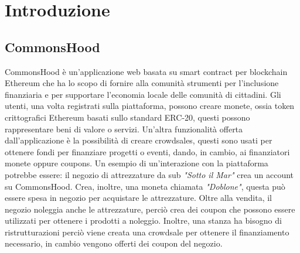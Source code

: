 \documentclass[a4paper]{article}
\begin{document}
    \section{Introduzione}
    \subsection{CommonsHood}
    CommonsHood è un’applicazione web basata su smart contract per blockchain Ethereum che ha lo scopo di fornire alla comunità strumenti per l’inclusione finanziaria e per supportare l’economia locale delle comunità di cittadini.
    Gli utenti, una volta registrati sulla piattaforma, possono creare monete, ossia token crittografici Ethereum basati sullo standard ERC-20, questi possono rappresentare beni di valore o servizi.
    \newline
    Un'altra funzionalità offerta dall'applicazione è la possibilità di creare crowdsales, questi sono usati per ottenere fondi per finanziare progetti o eventi, dando, in cambio, ai finanziatori monete oppure coupons.
    Un esempio di un'interazione con la piattaforma potrebbe essere: il negozio di attrezzature da sub \emph{"Sotto il Mar"} crea un account su CommonsHood. Crea, inoltre, una moneta chiamata \emph{"Doblone"}, questa può essere spesa in negozio
    per acquistare le attrezzature. Oltre alla vendita, il negozio noleggia anche le attrezzature, perciò crea dei coupon che possono essere utilizzati per ottenere i prodotti a noleggio.
    Inoltre, una stanza ha bisogno di ristrutturazioni perciò viene creata una crowdsale per ottenere il finanziamento necessario, in cambio vengono offerti dei coupon del negozio.
    
\end{document}
